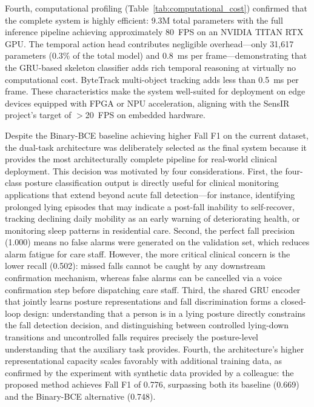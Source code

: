 Fourth, computational profiling (Table~\ref{tab:computational_cost}) confirmed that the complete system is highly efficient: 9.3M total parameters with the full inference pipeline achieving approximately 80~FPS on an NVIDIA TITAN RTX GPU. The temporal action head contributes negligible overhead---only 31{,}617 parameters (0.3\% of the total model) and 0.8~ms per frame---demonstrating that the GRU-based skeleton classifier adds rich temporal reasoning at virtually no computational cost. ByteTrack multi-object tracking adds less than 0.5~ms per frame. These characteristics make the system well-suited for deployment on edge devices equipped with FPGA or NPU acceleration, aligning with the SensIR project's target of $>$20~FPS on embedded hardware.

Despite the Binary-BCE baseline achieving higher Fall F1 on the current dataset, the dual-task architecture was deliberately selected as the final system because it provides the most architecturally complete pipeline for real-world clinical deployment. This decision was motivated by four considerations. First, the four-class posture classification output is directly useful for clinical monitoring applications that extend beyond acute fall detection---for instance, identifying prolonged lying episodes that may indicate a post-fall inability to self-recover, tracking declining daily mobility as an early warning of deteriorating health, or monitoring sleep patterns in residential care. Second, the perfect fall precision (1.000) means no false alarms were generated on the validation set, which reduces alarm fatigue for care staff. However, the more critical clinical concern is the lower recall (0.502): missed falls cannot be caught by any downstream confirmation mechanism, whereas false alarms can be cancelled via a voice confirmation step before dispatching care staff. Third, the shared GRU encoder that jointly learns posture representations and fall discrimination forms a closed-loop design: understanding that a person is in a lying posture directly constrains the fall detection decision, and distinguishing between controlled lying-down transitions and uncontrolled falls requires precisely the posture-level understanding that the auxiliary task provides. Fourth, the architecture's higher representational capacity scales favorably with additional training data, as confirmed by the experiment with synthetic data provided by a colleague: the proposed method achieves Fall F1 of 0.776, surpassing both its baseline (0.669) and the Binary-BCE alternative (0.748).

